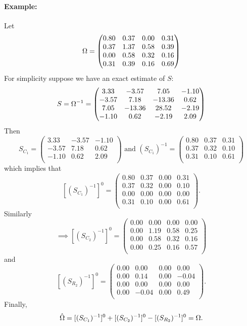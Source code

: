\documentclass[12pt, leqno]{article}
\let\oldhat\hat
\renewcommand{\hat}[1]{\oldhat{{#1}}}
\def\om{\ensuremath\Omega}
\begin{document}
\paragraph{Example:}
Let 
\begin{align*}
\om &= \begin{pmatrix}{}
  0.80 & 0.37 & 0.00 & 0.31 \\ 
  0.37 & 1.37 & 0.58 & 0.39 \\ 
  0.00 & 0.58 & 0.32 & 0.16 \\ 
  0.31 & 0.39 & 0.16 & 0.69 \\ 
  \end{pmatrix}\\
\end{align*}
For simplicity suppose we have an exact estimate of $S$:
\[
 S =\om^{-1} = \begin{pmatrix}{}
  3.33 & -3.57 & 7.05 & -1.10 \\ 
  -3.57 & 7.18 & -13.36 & 0.62 \\ 
  7.05 & -13.36 & 28.52 & -2.19 \\ 
  -1.10 & 0.62 & -2.19 & 2.09 \\ 
  \end{pmatrix}
\]
Then
\[
S_{C_1} = \begin{pmatrix}{}
  3.33 & -3.57 & -1.10 \\ 
  -3.57 & 7.18 & 0.62 \\ 
  -1.10 & 0.62 & 2.09 \\ 
  \end{pmatrix} 
\text{ and } (S_{C_1})^{-1} =
\begin{pmatrix}{}
  0.80 & 0.37 & 0.31 \\ 
  0.37 & 0.32 & 0.10 \\ 
  0.31 & 0.10 & 0.61 \\ 
  \end{pmatrix}
\]
which implies that
\[
[(S_{C_1})^{-1}]^0 =
\begin{pmatrix}{}
  0.80 & 0.37 & 0.00 & 0.31 \\ 
  0.37 & 0.32 & 0.00 & 0.10 \\ 
  0.00 & 0.00 & 0.00 & 0.00 \\ 
  0.31 & 0.10 & 0.00 & 0.61 \\ 
  \end{pmatrix}. 
\]
Similarly 
\[
\implies [(S_{C_2})^{-1}]^0 = \begin{pmatrix}{}
  0.00 & 0.00 & 0.00 & 0.00 \\ 
  0.00 & 1.19 & 0.58 & 0.25 \\ 
  0.00 & 0.58 & 0.32 & 0.16 \\ 
  0.00 & 0.25 & 0.16 & 0.57 \\ 
  \end{pmatrix}
\]
and
\[
[(S_{R_2})^{-1}]^0 = \begin{pmatrix}{}
  0.00 & 0.00 & 0.00 & 0.00 \\ 
  0.00 & 0.14 & 0.00 & -0.04 \\ 
  0.00 & 0.00 & 0.00 & 0.00 \\ 
  0.00 & -0.04 & 0.00 & 0.49 \\ 
  \end{pmatrix}.
\]
Finally,
\[
\hat{\om} = [(S_{C_1})^{-1}]^0 + [(S_{C_2})^{-1}]^0 -
[(S_{R_2})^{-1}]^0  = \om.
\]
\end{document}
